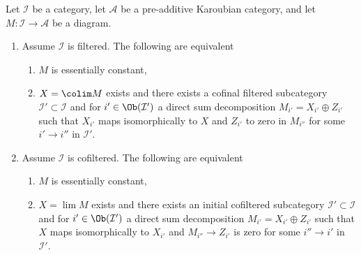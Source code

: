 \begin{lemma}
\label{lemma-essentially-constant-into-karoubian}
Let $\mathcal{I}$ be a category, let $\mathcal{A}$ be a pre-additive
Karoubian category, and let $M : \mathcal{I} \to \mathcal{A}$ be a diagram.
\begin{enumerate}
\item Assume $\mathcal{I}$ is filtered. The following are equivalent
\begin{enumerate}
\item $M$ is essentially constant,
\item $X = \colim M$ exists and there exists a cofinal filtered subcategory
$\mathcal{I}' \subset \mathcal{I}$ and for $i' \in \Ob(\mathcal{I}')$
a direct sum decomposition $M_{i'} = X_{i'} \oplus Z_{i'}$ such that
$X_{i'}$ maps isomorphically to $X$ and $Z_{i'}$ to zero in $M_{i''}$
for some $i' \to i''$ in $\mathcal{I}'$.
\end{enumerate}
\item Assume $\mathcal{I}$ is cofiltered. The following are equivalent
\begin{enumerate}
\item $M$ is essentially constant,
\item $X = \lim M$ exists and there exists an initial cofiltered subcategory
$\mathcal{I}' \subset \mathcal{I}$ and for $i' \in \Ob(\mathcal{I}')$
a direct sum decomposition $M_{i'} = X_{i'} \oplus Z_{i'}$
such that $X$ maps isomorphically to $X_{i'}$ and $M_{i''} \to Z_{i'}$
is zero for some $i'' \to i'$ in $\mathcal{I}'$.
\end{enumerate}
\end{enumerate}
\end{lemma}

